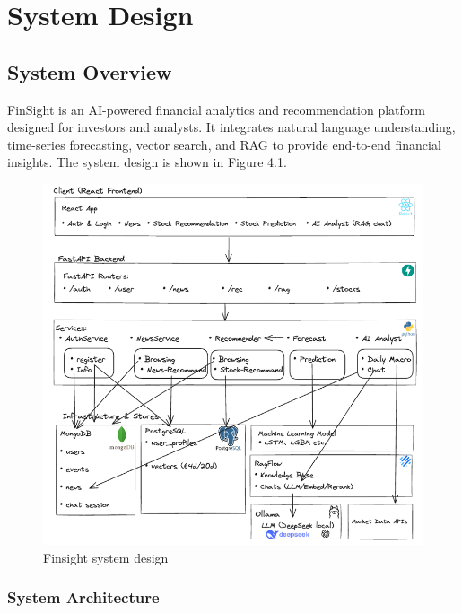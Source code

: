 \chapter{System Design}
\section{System Overview}
FinSight is an AI-powered financial analytics and recommendation platform designed for investors and analysts. It integrates natural language understanding, time-series forecasting, vector search, and \acf{RAG} to provide end-to-end financial insights. The system design is shown in Figure 4.1.
\begin{figure}[ht!] %
	\centering
	\includegraphics[width=1\linewidth]{images/system_design.png}
	\caption[system design]{Finsight system design}
	\label{fig:system_design}
\end{figure}

\subsection{System Architecture}

